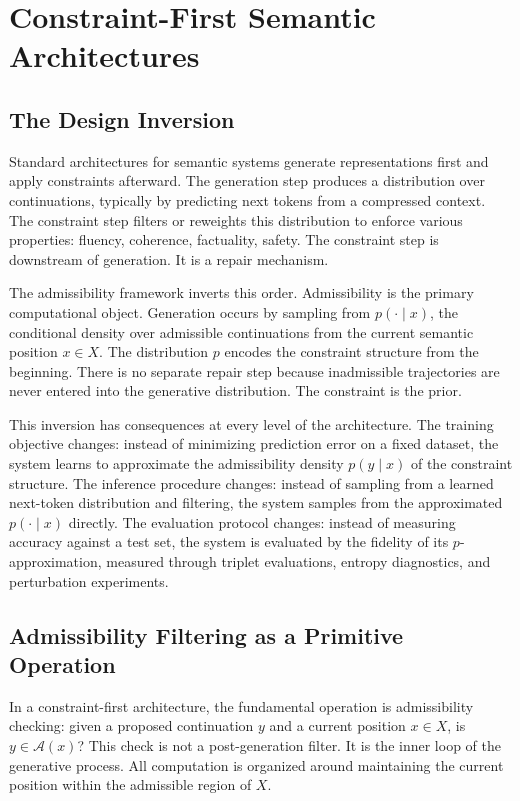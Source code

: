 \documentclass[12pt, oneside]{book}
\theoremstyle{plain-flyxion}
\theoremstyle{definition-flyxion}
\newcommand{\A}{\mathcal{A}}
\begin{document}
\chapter{Constraint-First Semantic Architectures}

\section{The Design Inversion}

Standard architectures for semantic systems generate representations first and apply
constraints afterward. The generation step produces a distribution over continuations,
typically by predicting next tokens from a compressed context. The constraint step filters
or reweights this distribution to enforce various properties: fluency, coherence,
factuality, safety. The constraint step is downstream of generation. It is a repair
mechanism.

The admissibility framework inverts this order. Admissibility is the primary
computational object. Generation occurs by sampling from $p(\cdot\mid x)$, the
conditional density over admissible continuations from the current semantic position
$x\in X$. The distribution $p$ encodes the constraint structure from the beginning.
There is no separate repair step because inadmissible trajectories are never entered into
the generative distribution. The constraint is the prior.

This inversion has consequences at every level of the architecture. The training objective
changes: instead of minimizing prediction error on a fixed dataset, the system learns to
approximate the admissibility density $p(y\mid x)$ of the constraint structure. The
inference procedure changes: instead of sampling from a learned next-token distribution
and filtering, the system samples from the approximated $p(\cdot\mid x)$ directly. The
evaluation protocol changes: instead of measuring accuracy against a test set, the system
is evaluated by the fidelity of its $p$-approximation, measured through triplet
evaluations, entropy diagnostics, and perturbation experiments.

\section{Admissibility Filtering as a Primitive Operation}

In a constraint-first architecture, the fundamental operation is admissibility checking:
given a proposed continuation $y$ and a current position $x\in X$, is $y\in\A(x)$? This
check is not a post-generation filter. It is the inner loop of the generative process.
All computation is organized around maintaining the current position within the admissible
region of $X$.
\end{document}
